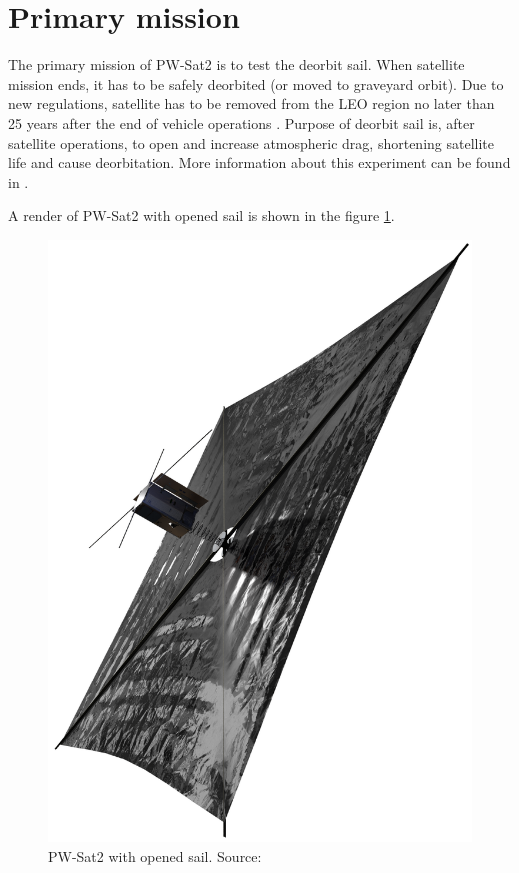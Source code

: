     \section{Primary mission}
        The primary mission of PW-Sat2 is to test the deorbit sail. When satellite mission ends, it has to be safely deorbited (or moved to graveyard orbit). Due to new regulations, satellite has to be removed from
        the LEO region no later than 25 years after the end of vehicle operations \cite{Satellite_disposal}. Purpose of deorbit sail is, after satellite operations, to open and increase atmospheric drag, shortening satellite life and cause deorbitation. More information about this experiment can be found in \cite{DDC_article}.

        A render of PW-Sat2 with opened sail is shown in the figure \ref{PW-Sat_render_sail}.

        \begin{figure}[H]
            \centering
            \includegraphics[width=0.38\paperwidth]{img/4/PW-Sat2_render_02.png}
            \caption{PW-Sat2 with opened sail. Source: \cite{PW_sat2_photo}}
            \label{PW-Sat_render_sail}
        \end{figure}

